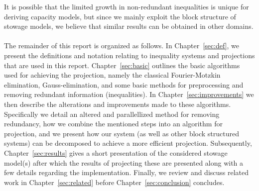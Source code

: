 It is possible that the limited growth in non-redundant inequalities is unique for deriving capacity models, but since we mainly exploit the block structure of stowage models, we believe that similar results can be obtained in other domains.
\\
\\
The remainder of this report is organized as follows.
In Chapter~\ref{sec:def}, we present the definitions and notation relating to inequality systems and projections that are used in this report. 
Chapter~\ref{sec:basic} outlines the basic algorithms used for achieving the projection, namely the classical Fourier-Motzkin elimination, Gauss-elimination, and some basic methods for preprocessing and removing redundant information (inequalities). 
In Chapter~\ref{sec:improvements} we then describe the alterations and improvements made to these algorithms. Specifically we detail an altered and parallellized method for removing redundancy, how we combine the mentioned steps into an algorithm for projection, and we present how our system (as well as other block structured systems) can be decomposed to achieve a more efficient projection.    
Subsequently, Chapter~\ref{sec:results} gives a short presentation of the considered stowage model(s) after which the results of projecting these are presented along with a few details regarding the implementation. 
Finally, we review and discuss related work in Chapter~\ref{sec:related} before Chapter~\ref{sec:conclusion} concludes.